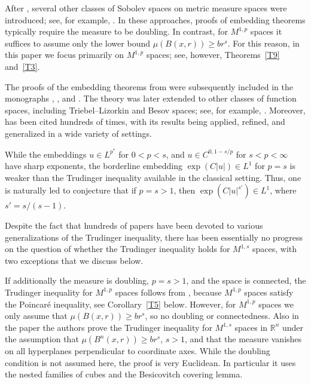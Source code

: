 \documentclass[12pt,leqno]{amsart}
\theoremstyle{definition}
\newcommand{\bbbr}{\mathbb R}
\numberwithin{theorem}{section} \numberwithin{equation}{section}
\begin{document}
After \cite{hajlasz2}, several other classes of Sobolev spaces on metric measure spaces were introduced; see, for example, \cite{ambrosiogs,cheeger,hajlasz,SMP,shanmugalingam}. In these approaches, proofs of embedding theorems typically require the measure to be doubling. In contrast, for $M^{1,p}$ spaces it suffices to assume only the lower bound $\mu(B(x,r))\geq br^s$. For this reason, in this paper we focus primarily on $M^{1,p}$ spaces; see, however, Theorems~\ref{T9} and~\ref{T3}.


The proofs of the embedding theorems from \cite{hajlasz,hajlasz2} were subsequently included in the monographs \cite[Theorem~5.4.2]{AT}, \cite[Theorem~8.6 (Theorem~12.1 in the preprint version)]{DGN}, and \cite[Theorem~8.1.18]{HKST}. The theory was later extended to other classes of function spaces, including Triebel--Lizorkin and Besov spaces; see, for example, \cite{AYY21,AYY24,GKZ,KosYZ,KosYZ2}. Moreover, \cite{hajlasz2} has been cited hundreds of times, with its results being applied, refined, and generalized in a wide variety of settings.

While the embeddings $u\in L^{p^*}$ for $0<p<s$, and $u\in C^{0,1-s/p}$ for $s<p<\infty$ have sharp exponents, the borderline embedding $\exp(C|u|)\in L^1$ for $p=s$ is weaker than the Trudinger inequality available in the classical setting. Thus, one is naturally led to conjecture that if $p=s>1$, then $\exp(C|u|^{s'})\in L^1$, where $s'=s/(s-1)$.

Despite the fact that hundreds of papers have been devoted to various generalizations of the Trudinger inequality, there has been essentially no progress on the question of whether the Trudinger inequality holds for $M^{1,s}$ spaces, with two exceptions that we discuss below.

If additionally the measure is doubling, $p=s>1$, and the space is connected, the Trudinger inequality for $M^{1,p}$ spaces follows from \cite[Theorem~6.1]{SMP}, because $M^{1,p}$ spaces satisfy the Poincar\'e inequality, see Corollary~\ref{T5} below. However, for $M^{1,p}$ spaces we only assume that $\mu(B(x,r))\geq b r^s$, so no doubling or connectedness. Also in the paper \cite[Theorem~1.1 and (6)]{GK} the authors prove the Trudinger inequality for $M^{1,s}$ spaces in $\bbbr^n$ under the assumption that $\mu(B^n(x,r))\geq br^s$, $s>1$, and that the measure vanishes on all hyperplanes perpendicular to coordinate axes. While the doubling condition is not assumed here, the proof is very Euclidean. In particular it uses the nested families of cubes and the Besicovitch covering lemma. 
\end{document}
